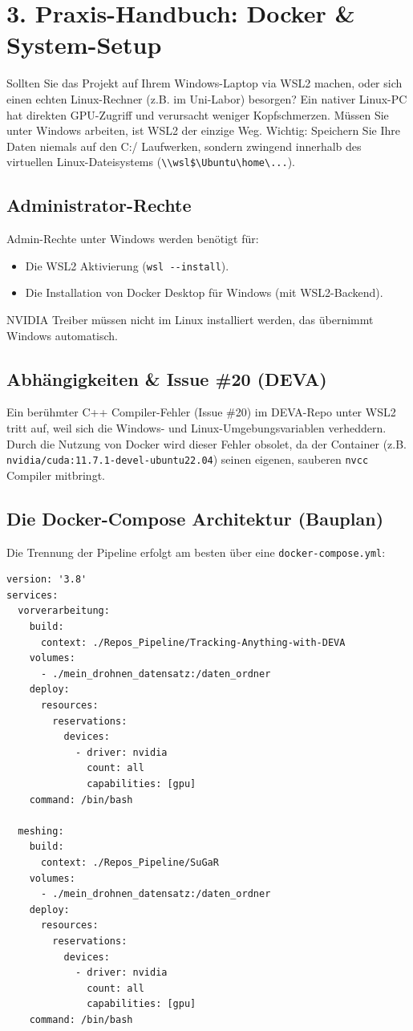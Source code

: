 \documentclass[11pt, a4paper]{article}
\begin{document}
\section{3. Praxis-Handbuch: Docker \& System-Setup}

Sollten Sie das Projekt auf Ihrem Windows-Laptop via WSL2 machen, oder sich einen echten Linux-Rechner (z.B. im Uni-Labor) besorgen? Ein nativer Linux-PC hat direkten GPU-Zugriff und verursacht weniger Kopfschmerzen. M\"ussen Sie unter Windows arbeiten, ist WSL2 der einzige Weg. Wichtig: Speichern Sie Ihre Daten niemals auf den C:/ Laufwerken, sondern zwingend innerhalb des virtuellen Linux-Dateisystems (\texttt{\textbackslash\textbackslash wsl\$\textbackslash Ubuntu\textbackslash home\textbackslash...}).

\subsection{Administrator-Rechte}
Admin-Rechte unter Windows werden ben\"otigt f\"ur:
\begin{itemize}[noitemsep]
    \item Die WSL2 Aktivierung (\texttt{wsl -{}-install}).
    \item Die Installation von Docker Desktop f\"ur Windows (mit WSL2-Backend).
\end{itemize}
NVIDIA Treiber m\"ussen nicht im Linux installiert werden, das \"ubernimmt Windows automatisch.

\subsection{Abh\"angigkeiten \& Issue \#20 (DEVA)}
Ein ber\"uhmter C++ Compiler-Fehler (Issue \#20) im DEVA-Repo unter WSL2 tritt auf, weil sich die Windows- und Linux-Umgebungsvariablen verheddern. Durch die Nutzung von Docker wird dieser Fehler obsolet, da der Container (z.B. \texttt{nvidia/cuda:11.7.1-devel-ubuntu22.04}) seinen eigenen, sauberen \texttt{nvcc} Compiler mitbringt.

\subsection{Die Docker-Compose Architektur (Bauplan)}
Die Trennung der Pipeline erfolgt am besten \"uber eine \texttt{docker-compose.yml}:

\begin{lstlisting}
version: '3.8'
services:
  vorverarbeitung:
    build:
      context: ./Repos_Pipeline/Tracking-Anything-with-DEVA
    volumes:
      - ./mein_drohnen_datensatz:/daten_ordner
    deploy:
      resources:
        reservations:
          devices:
            - driver: nvidia
              count: all
              capabilities: [gpu]
    command: /bin/bash

  meshing:
    build:
      context: ./Repos_Pipeline/SuGaR
    volumes:
      - ./mein_drohnen_datensatz:/daten_ordner
    deploy:
      resources:
        reservations:
          devices:
            - driver: nvidia
              count: all
              capabilities: [gpu]
    command: /bin/bash
\end{lstlisting}
\end{document}

